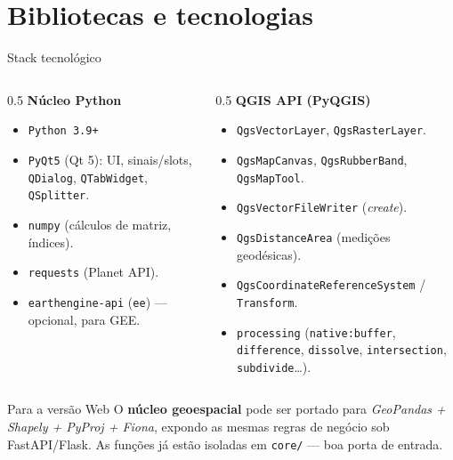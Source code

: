 \documentclass[10pt,aspectratio=169]{beamer}
\begin{document}
\section{Bibliotecas e tecnologias}
\begin{frame}{Stack tecnológico}
  \begin{columns}[T,onlytextwidth]
    \begin{column}{0.5\textwidth}
      \textbf{Núcleo Python}
      \begin{itemize}
        \item \texttt{Python 3.9+}
        \item \texttt{PyQt5} (Qt 5): UI, sinais/slots, \texttt{QDialog}, \texttt{QTabWidget}, \texttt{QSplitter}.
        \item \texttt{numpy} (cálculos de matriz, índices).
        \item \texttt{requests} (Planet API).
        \item \texttt{earthengine-api} (\texttt{ee}) — opcional, para GEE.
      \end{itemize}
    \end{column}
    \begin{column}{0.5\textwidth}
      \textbf{QGIS API (PyQGIS)}
      \begin{itemize}
        \item \texttt{QgsVectorLayer}, \texttt{QgsRasterLayer}.
        \item \texttt{QgsMapCanvas}, \texttt{QgsRubberBand}, \texttt{QgsMapTool}.
        \item \texttt{QgsVectorFileWriter} (\emph{create}).
        \item \texttt{QgsDistanceArea} (medições geodésicas).
        \item \texttt{QgsCoordinateReferenceSystem} / \texttt{Transform}.
        \item \texttt{processing} (\texttt{native:buffer}, \texttt{difference}, \texttt{dissolve}, \texttt{intersection}, \texttt{subdivide}\ldots).
      \end{itemize}
    \end{column}
  \end{columns}
  \vfill
  \begin{alertblock}{Para a versão Web}
    O \textbf{núcleo geoespacial} pode ser portado para \emph{GeoPandas + Shapely + PyProj + Fiona}, expondo as mesmas regras de negócio sob FastAPI/Flask. As funções já estão isoladas em \texttt{core/} — boa porta de entrada.
  \end{alertblock}
\end{frame}
\end{document}
